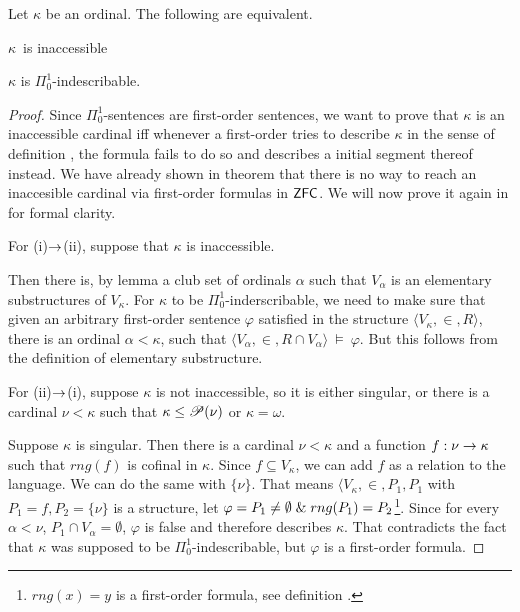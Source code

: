 \begin{theorem}
Let $\kappa$ be an ordinal. The following are equivalent.
\bce[(i)]
\item $\kappa$ is inaccessible
\item $\kappa$ is $\Pi^1_0$-indescribable.
\ece
\end{theorem}



\begin{proof}
Since $\Pi^1_0$-sentences are first-order sentences, we want to prove that $\kappa$ is an inaccessible cardinal iff whenever a first-order tries to describe $\kappa$ in the sense of definition , the formula fails to do so and describes a initial segment thereof instead.
We have already shown in theorem  that there is no way to reach an inaccesible cardinal via first-order formulas in $\sf{ZFC}$. We will now prove it again in for formal clarity.

For (i)$\rightarrow$(ii), suppose that $\kappa$ is inaccessible.

Then there is, by lemma  a club set of ordinals $\alpha$ such that $V_\alpha$ is an elementary substructures of $V_\kappa$. 
For $\kappa$ to be $\Pi^1_0$-inderscribable, we need to make sure that given an arbitrary first-order sentence $\varphi$ satisfied in the structure $\langle V_\kappa, \in, R \rangle$, there is an ordinal $\alpha < \kappa$, such that $\langle V_\alpha, \in, R \cap V_\alpha \rangle~\models~\varphi$. But this follows from the definition of elementary substructure.

For (ii)$\rightarrow$(i), suppose $\kappa$ is not inaccessible, so it is either singular, or there is a cardinal $\nu < \kappa$ such that $\kappa \leq \mathscr{P} (\nu)$ or $\kappa=\omega$. 


Suppose $\kappa$ is singular. Then there is a cardinal $\nu < \kappa$ and a function $f: \nu \rightarrow \kappa$ such that $rng(f)$ is cofinal in $\kappa$. Since $f \subseteq V_\kappa$, we can add $f$ as a relation to the language. We can do the same with $\{\nu\}$. That means $\langle V_\kappa, \in, P_1, P_1$ with $P_1 = f, P_2 = \{\nu\}$ is a structure, 
let $\varphi = P_1 \neq \emptyset \mathrel{\&} rng(P_1) = P_2$\footnote{$rng(x)=y$ is a first-order formula, see definition .}. Since for every $\alpha < \nu$, $P_1 \cap V_\alpha = \emptyset$, $\varphi$ is false and therefore describes $\kappa$. That contradicts the fact that $\kappa$ was supposed to be $\Pi^1_0$-indescribable, but $\varphi$ is a first-order formula.


\end{proof}
